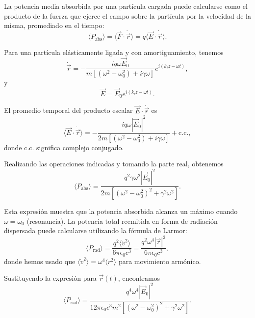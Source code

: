 \documentclass[12pt,a4paper]{book}
\begin{document}
La potencia media absorbida por una partícula cargada puede calcularse como el producto de la fuerza que ejerce el campo sobre la partícula por la velocidad de la misma, promediado en el tiempo:
\begin{equation}
\langle P_{\text{abs}} \rangle = \langle \vec{F} \cdot \dot{\vec{r}} \rangle = q\langle \vec{E} \cdot \dot{\vec{r}} \rangle.
\end{equation}

Para una partícula elásticamente ligada y con amortiguamiento, tenemos
\begin{equation}
\dot{\vec{r}} = -\frac{iq\omega\vec{E}_0}{m[(\omega^2-\omega_0^2) + i\gamma\omega]}e^{i(k_iz-\omega t)},
\end{equation}
y
\begin{equation}
\vec{E} = \vec{E}_0e^{i(k_iz-\omega t)}.
\end{equation}

El promedio temporal del producto escalar $\vec{E} \cdot \dot{\vec{r}}$ es
\begin{equation}
\langle \vec{E} \cdot \dot{\vec{r}} \rangle = -\frac{iq\omega|\vec{E}_0|^2}{2m[(\omega^2-\omega_0^2) + i\gamma\omega]} + \text{c.c.},
\end{equation}
donde c.c. significa complejo conjugado.

Realizando las operaciones indicadas y tomando la parte real, obtenemos
\begin{equation}
\langle P_{\text{abs}} \rangle = \frac{q^2\gamma\omega^2|\vec{E}_0|^2}{2m[(\omega^2-\omega_0^2)^2 + \gamma^2\omega^2]}.
\end{equation}

Esta expresión muestra que la potencia absorbida alcanza un máximo cuando $\omega = \omega_0$ (resonancia). La potencia total reemitida en forma de radiación dispersada puede calcularse utilizando la fórmula de Larmor:
\begin{equation}
\langle P_{\text{rad}} \rangle = \frac{q^2\langle\dot{v}^2\rangle}{6\pi\epsilon_0c^3} = \frac{q^2\omega^4|\vec{r}|^2}{6\pi\epsilon_0c^3},
\end{equation}
donde hemos usado que $\langle\dot{v}^2\rangle = \omega^4\langle r^2 \rangle$ para movimiento armónico.

Sustituyendo la expresión para $\vec{r}(t)$, encontramos
\begin{equation}
\langle P_{\text{rad}} \rangle = \frac{q^4\omega^4|\vec{E}_0|^2}{12\pi\epsilon_0c^3m^2[(\omega^2-\omega_0^2)^2 + \gamma^2\omega^2]}.
\end{equation}
\end{document}
